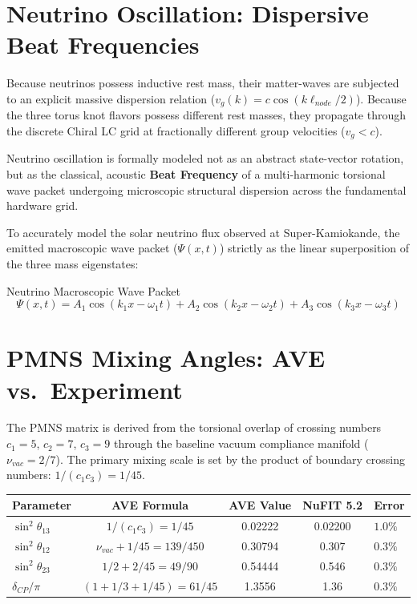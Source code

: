 \section{Neutrino Oscillation: Dispersive Beat Frequencies}
Because neutrinos possess inductive rest mass, their matter-waves are subjected to an explicit massive dispersion relation ($v_g(k) = c \cos(k \ell_{node}/2)$). Because the three torus knot flavors possess different rest masses, they propagate through the discrete Chiral LC grid at fractionally different group velocities ($v_g < c$).

Neutrino oscillation is formally modeled not as an abstract state-vector rotation, but as the classical, acoustic \textbf{Beat Frequency} of a multi-harmonic torsional wave packet undergoing microscopic structural dispersion across the fundamental hardware grid.

To accurately model the solar neutrino flux observed at Super-Kamiokande, the emitted macroscopic wave packet ($\Psi(x,t)$) strictly as the linear superposition of the three mass eigenstates:
\begin{resultbox}{Neutrino Macroscopic Wave Packet}
\begin{equation}
    \Psi(x,t) = A_1 \cos(k_1 x - \omega_1 t) + A_2 \cos(k_2 x - \omega_2 t) + A_3 \cos(k_3 x - \omega_3 t)
\end{equation}
\end{resultbox}

\section{PMNS Mixing Angles: AVE vs.\ Experiment}

The PMNS matrix is derived from the torsional overlap of crossing numbers $c_1 = 5$, $c_2 = 7$, $c_3 = 9$ through the baseline vacuum compliance manifold ($\nu_{vac} = 2/7$). The primary mixing scale is set by the product of boundary crossing numbers: $1/(c_1 c_3) = 1/45$.

\begin{center}
\small
\renewcommand{\arraystretch}{1.2}
\begin{tabular}{lcccl}
\toprule
\textbf{Parameter} & \textbf{AVE Formula} & \textbf{AVE Value} & \textbf{NuFIT 5.2} & \textbf{Error} \\
\midrule
$\sin^2\theta_{13}$ & $1/(c_1 c_3) = 1/45$ & 0.02222 & 0.02200 & $1.0\%$ \\
$\sin^2\theta_{12}$ & $\nu_{vac} + 1/45 = 139/450$ & 0.30794 & 0.307 & $0.3\%$ \\
$\sin^2\theta_{23}$ & $1/2 + 2/45 = 49/90$ & 0.54444 & 0.546 & $0.3\%$ \\
$\delta_{CP}/\pi$   & $(1 + 1/3 + 1/45) = 61/45$ & 1.3556 & 1.36 & $0.3\%$ \\
\bottomrule
\end{tabular}
\end{center}

